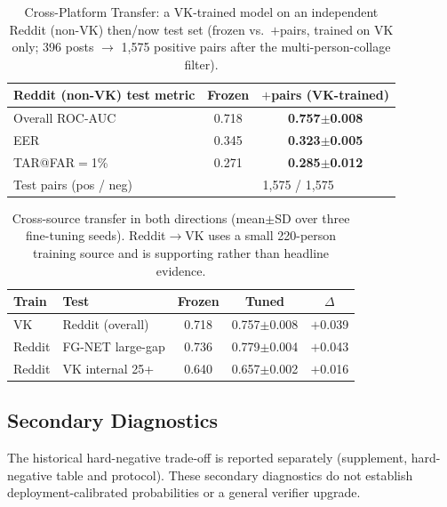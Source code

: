 \documentclass[journal]{IEEEtran}
\begin{document}
\begin{table}[!t]
\renewcommand{\arraystretch}{1.2}
\caption{Cross-Platform Transfer: a VK-trained model on an independent Reddit (non-VK) then/now test set (frozen vs.\ $+$pairs, trained on VK only; 396 posts $\rightarrow$ 1{,}575 positive pairs after the multi-person-collage filter).}
\label{tab:crossplatform}
\centering
\footnotesize
\begin{tabular}{@{}lcc@{}}
\toprule
Reddit (non-VK) test metric & Frozen & $+$pairs (VK-trained) \\
\midrule
Overall ROC-AUC & 0.718 & \textbf{0.757$\pm$0.008} \\
EER & 0.345 & \textbf{0.323$\pm$0.005} \\
TAR@FAR$=$1\% & 0.271 & \textbf{0.285$\pm$0.012} \\
\midrule
Test pairs (pos / neg) & \multicolumn{2}{c}{1{,}575 / 1{,}575} \\
\bottomrule
\end{tabular}
\end{table}

\begin{table}[!t]
\renewcommand{\arraystretch}{1.2}
\caption{Cross-source transfer in both directions (mean$\pm$SD over three fine-tuning seeds). Reddit$\to$VK uses a small 220-person training source and is supporting rather than headline evidence.}
\label{tab:crosssource}
\centering
\footnotesize
\begin{tabular}{@{}llccc@{}}
\toprule
Train & Test & Frozen & Tuned & $\Delta$ \\
\midrule
VK & Reddit (overall) & 0.718 & 0.757$\pm$0.008 & $+$0.039 \\
Reddit & FG-NET large-gap & 0.736 & 0.779$\pm$0.004 & $+$0.043 \\
Reddit & VK internal 25+ & 0.640 & 0.657$\pm$0.002 & $+$0.016 \\
\bottomrule
\end{tabular}
\end{table}

\subsection{Secondary Diagnostics}\label{sec:res-hardneg}
The historical hard-negative trade-off is reported separately (supplement, hard-negative table and protocol). These secondary diagnostics do not establish deployment-calibrated probabilities or a general verifier upgrade.
\end{document}
